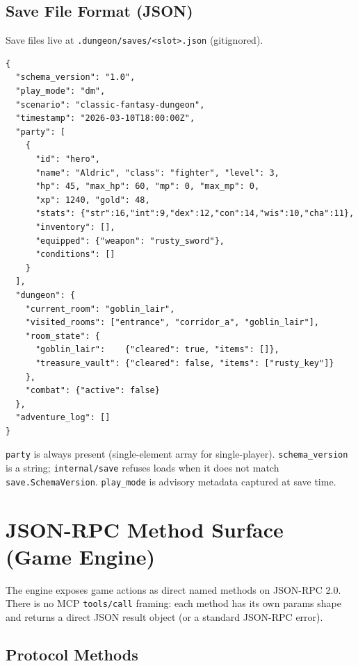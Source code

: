\documentclass[a4paper,10pt]{article}
\begin{document}
\subsection{Save File Format (JSON)}

Save files live at \texttt{.dungeon/saves/<slot>.json} (gitignored).

\begin{lstlisting}[title={.dungeon/saves/1.json (excerpt)}]
{
  "schema_version": "1.0",
  "play_mode": "dm",
  "scenario": "classic-fantasy-dungeon",
  "timestamp": "2026-03-10T18:00:00Z",
  "party": [
    {
      "id": "hero",
      "name": "Aldric", "class": "fighter", "level": 3,
      "hp": 45, "max_hp": 60, "mp": 0, "max_mp": 0,
      "xp": 1240, "gold": 48,
      "stats": {"str":16,"int":9,"dex":12,"con":14,"wis":10,"cha":11},
      "inventory": [],
      "equipped": {"weapon": "rusty_sword"},
      "conditions": []
    }
  ],
  "dungeon": {
    "current_room": "goblin_lair",
    "visited_rooms": ["entrance", "corridor_a", "goblin_lair"],
    "room_state": {
      "goblin_lair":    {"cleared": true, "items": []},
      "treasure_vault": {"cleared": false, "items": ["rusty_key"]}
    },
    "combat": {"active": false}
  },
  "adventure_log": []
}
\end{lstlisting}

\texttt{party} is always present (single-element array for single-player).
\texttt{schema\_version} is a string; \texttt{internal/save} refuses loads
when it does not match \texttt{save.SchemaVersion}.  \texttt{play\_mode}
is advisory metadata captured at save time.

\section{JSON-RPC Method Surface (Game Engine)}

The engine exposes game actions as direct named methods on JSON-RPC
2.0.  There is no MCP \texttt{tools/call} framing: each method has
its own params shape and returns a direct JSON result object (or a
standard JSON-RPC error).

\subsection{Protocol Methods}
\end{document}
